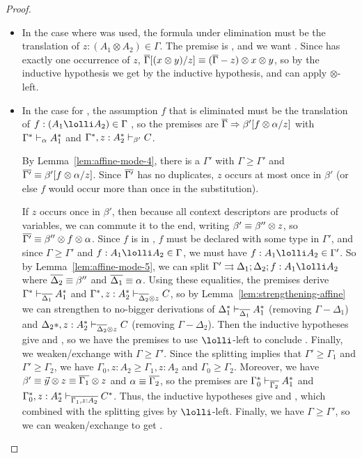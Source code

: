 \begin{proof}
\begin{itemize}
\item 
  In the case where \FL\/ was used, the formula under elimination must
  be the translation of $z:(A_1 \otimes A_2) \in \Gamma$. The premise is
  ,
  and we want .  Since \vars{\Gamma} has exactly one
  occurrence of $z$, $\overline{\Gamma}[(x \otimes y)/z] \equiv
  (\overline{\Gamma}-z)\otimes x \otimes y$, so by the inductive hypothesis
  we get  by the inductive hypothesis, and
  can apply $\otimes$-left.

\item In the case for \UL, the assumption $f$ that is eliminated must be
  the translation of $f:(A_1 \lolli A_2) \in \Gamma$ , so the premises
  are $\overline{\Gamma} \Rightarrow \beta'[f \otimes \alpha/z]$ with
  $\Gamma^* \vdash_{\alpha} A_1^*$ and
  $\Gamma^*,z:A_2^* \vdash_{\beta'} C$. 

  By Lemma~\ref{lem:affine-mode-4}, there is a $\Gamma'$ with $\Gamma
  \ge \Gamma'$ and $\overline{\Gamma'} \equiv \beta'[f \otimes \alpha/z]$.
  Since $\overline{\Gamma'}$ has no duplicates, $z$ occurs at most once in
  $\beta'$ (or else $f$ would occur more than once in the substitution).
  
  If $z$ occurs once in $\beta'$, then because all context descriptors
  are products of variables, we can commute it to the end, writing
  $\beta' \equiv \beta'' \otimes z$, so $\overline{\Gamma'} \equiv \beta''
  \otimes f \otimes \alpha$.  Since $f$ is in , $f$ must
  be declared with some type in $\Gamma'$, and since $\Gamma \ge
  \Gamma'$ and $f:A_1 \lolli A_2 \in \Gamma$, we must have $f:A_1 \lolli
  A_2 \in \Gamma'$.  So by Lemma~\ref{lem:affine-mode-5}, we can split
  $\Gamma' \splits \Delta_1;\Delta_2;f:A_1 \lolli A_2$ where
  $\overline{\Delta_2} \equiv \beta''$ and $\overline{\Delta_1} \equiv \alpha$.
  Using these equalities, the premises derive
  $\Gamma^* \vdash_{\overline{\Delta_1}} A_1^*$ and
  $\Gamma^*,z:A_2^* \vdash_{\overline{\Delta_2} \otimes z} C$, so by
  Lemma~\ref{lem:strengthening-affine} we can strengthen to no-bigger
  derivations of
  $\Delta_1^* \vdash_{\overline{\Delta_1}} A_1^*$ (removing $\Gamma-\Delta_1$) and
  $\Delta_2*,z:A_2^* \vdash_{\overline{\Delta_2} \otimes z} C$ (removing $\Gamma-\Delta_2$).
  Then the inductive hypotheses give  and
  , so we have the premises to use $\lolli$-left
  to conclude .  Finally, we weaken/exchange with
  $\Gamma \ge \Gamma'$.
  Since the splitting implies that $\Gamma' \ge \Gamma_1$ and $\Gamma'
  \ge \Gamma_2$, we have $\Gamma_0,z:A_2 \ge \Gamma_1,z:A_2$ and
  $\Gamma_0 \ge \Gamma_2$.  Moreover, we have $\beta' \equiv \vec{y}
  \otimes z \equiv \overline{\Gamma_1} \otimes z$ and $\alpha \equiv
  \overline{\Gamma_2}$, so the premises are
  $\Gamma_0^* \vdash_{\overline{\Gamma_2}} A_1^*$ and
  $\Gamma_0^*,z:A_2^* \vdash_{\overline{\Gamma_1,z:A_2}} C^*$.  Thus, the
  inductive hypotheses give  and
  , which combined with the splitting gives
   by $\lolli$-left.  Finally, we have $\Gamma \ge
  \Gamma'$, so we can weaken/exchange to get .


\end{itemize}
\end{proof}
